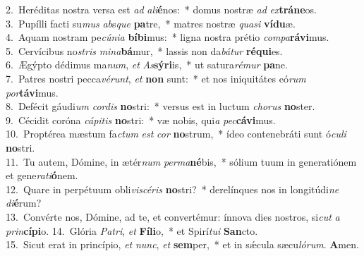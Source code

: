 {2.~}Heréditas nostra versa est \textit{ad} \textit{a}\textit{li}\textbf{é}nos:~* domus nostræ \textit{ad} \textit{ex}\textbf{trá}\textbf{ne}os.\\
{3.~}Pupílli facti su\textit{mus} \textit{ab}s\textit{que} \textbf{pa}tre,~* matres nostræ \textit{qua}\textit{si} \textbf{ví}\textbf{du}æ.\\
{4.~}Aquam nostram pe\textit{cú}\textit{ni}\textit{a} \textbf{bí}\textbf{bi}mus:~* ligna nostra prétio \textit{com}\textit{pa}\textbf{rá}\textbf{vi}mus.\\
{5.~}Cervícibus no\textit{stris} \textit{mi}\textit{na}\textbf{bá}mur,~* lassis non da\textit{bá}\textit{tur} \textbf{ré}\textbf{qui}es.\\
{6.~}Ægýpto dédimus ma\textit{num}, \textit{et} \textit{As}\textbf{sý}\textbf{ri}is,~* ut satura\textit{ré}\textit{mur} \textbf{pa}ne.\\
{7.~}Patres nostri pecca\textit{vé}\textit{runt}, \textit{et} \textbf{non} sunt:~* et nos iniquitátes eó\textit{rum} \textit{por}\textbf{tá}\textbf{vi}mus.\\
{8.~}Defécit gáudi\textit{um} \textit{cor}\textit{dis} \textbf{no}stri:~* versus est in luctum \textit{cho}\textit{rus} \textbf{no}ster.\\
{9.~}Cécidit coróna \textit{cá}\textit{pi}\textit{tis} \textbf{no}stri:~* væ nobis, qui\textit{a} \textit{pec}\textbf{cá}\textbf{vi}mus.\\
{10.~}Proptérea mæstum fa\textit{ctum} \textit{est} \textit{cor} \textbf{no}strum,~* ídeo contenebráti sunt ó\textit{cu}\textit{li} \textbf{no}stri.\\
{11.~}Tu autem, Dómine, in ætér\textit{num} \textit{per}\textit{ma}\textbf{né}bis,~* sólium tuum in generatiónem et gene\textit{ra}\textit{ti}\textbf{ó}nem.\\
{12.~}Quare in perpétuum obli\textit{vi}\textit{scé}\textit{ris} \textbf{no}stri?~* derelínques nos in longitúdi\textit{ne} \textit{di}\textbf{é}rum?\\
{13.~}Convérte nos, Dómine, ad te, et convertémur: ínnova dies nostros, si\textit{cut} \textit{a} \textit{prin}\textbf{cí}\textbf{pi}o.
{14.~}Glória \textit{Pa}\textit{tri}, \textit{et} \textbf{Fí}\textbf{li}o,~* et Spirí\textit{tu}\textit{i} \textbf{San}cto.\\
{15.~}Sicut erat in princípio, \textit{et} \textit{nunc}, \textit{et} \textbf{sem}per,~* et in sǽcula sæcu\textit{ló}\textit{rum}. \textbf{A}men.\\
